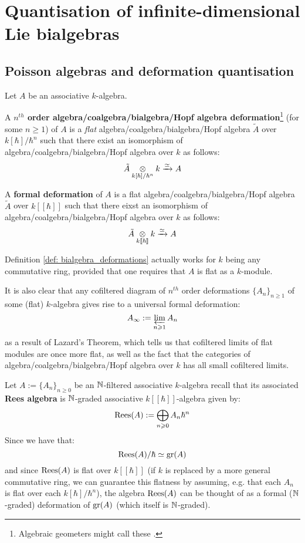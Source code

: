 \section{Quantisation of infinite-dimensional Lie bialgebras}
    \subsection{Poisson algebras and deformation quantisation}
        \begin{definition}[Deformations] \label{def: bialgebra_deformations}
            Let $A$ be an associative $k$-algebra.
            
            A \textbf{$n^{th}$ order algebra/coalgebra/bialgebra/Hopf algebra deformation}\footnote{Algebraic geometers might call these .} (for some $n \geq 1$) of $A$ is a \textit{flat} algebra/coalgebra/bialgebra/Hopf algebra $\tilde{A}$ over $k[\hbar]/\hbar^n$ such that there exist an isomorphism of algebra/coalgebra/bialgebra/Hopf algebra over $k$ as follows:
                $$\tilde{A} \tensor_{k[\hbar]/\hbar^n} k \xrightarrow[]{\cong} A$$
                
            A \textbf{formal deformation} of $A$ is a flat algebra/coalgebra/bialgebra/Hopf algebra $\tilde{A}$ over $k[\![\hbar]\!]$ such that there eixst an isomorphism of algebra/coalgebra/bialgebra/Hopf algebra over $k$ as follows:
                $$\tilde{A} \tensor_{k[\![\hbar]\!]} k \xrightarrow[]{\cong} A$$
        \end{definition}
        \begin{remark}
            Definition \ref{def: bialgebra_deformations} actually works for $k$ being any commutative ring, provided that one requires that $A$ is flat as a $k$-module. 
            
            It is also clear that any cofiltered diagram of $n^{th}$ order deformations $\{A_n\}_{n \geq 1}$ of some (flat) $k$-algebra gives rise to a universal formal deformation:
                $$A_{\infty} := \projlim_{n \geq 1} A_n$$
            as a result of Lazard's Theorem, which tells us that cofiltered limits of flat modules are once more flat, as well as the fact that the categories of algebra/coalgebra/bialgebra/Hopf algebra over $k$ has all small cofiltered limits. 
        \end{remark}
        \begin{example} \label{example: rees_algebras_as_formal_flat_deformations}
            Let $A := \{A_n\}_{n \geq 0}$ be an $\N$-filtered associative $k$-algebra recall that its associated \textbf{Rees algebra} is $\N$-graded associative $k[\![\hbar]\!]$-algebra given by:
                $$\Rees(A) := \bigoplus_{n \geq 0} A_n \hbar^n$$
            Since we have that:
                $$\Rees(A)/\hbar \cong \gr(A)$$
            and since $\Rees(A)$ is flat over $k[\![\hbar]\!]$ (if $k$ is replaced by a more general commutative ring, we can guarantee this flatness by assuming, e.g. that each $A_n$ is flat over each $k[\hbar]/\hbar^n$), the algebra $\Rees(A)$ can be thought of as a formal ($\N$-graded) deformation of $\gr(A)$ (which itself is $\N$-graded). 
        \end{example}

